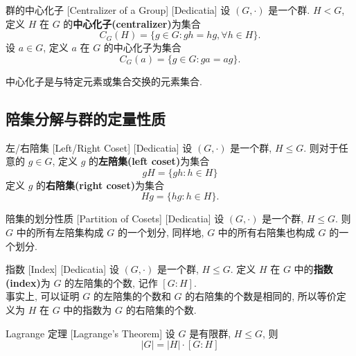         \begin{dfn}
            {群的中心化子}
            [Centralizer of a Group]
            [Dedicatia]
            设 \((G,\cdot)\) 是一个群. \(H<G\), 定义 \(H\) 在 \(G\) 的\textbf{中心化子(centralizer)}为集合
            \[C_G(H)=\{g\in G: gh=hg, \forall h\in H\}.\]
            设 \(a\in G\), 定义 \(a\) 在 \(G\) 的中心化子为集合
            \[C_G(a)=\{g\in G: ga=ag\}.\]
        \end{dfn}

        \begin{rmk}
            中心化子是与特定元素或集合交换的元素集合.
        \end{rmk}

    \subsection{陪集分解与群的定量性质}

        \begin{dfn}
            {左/右陪集}
            [Left/Right Coset]
            [Dedicatia]
            设 \((G,\cdot)\) 是一个群, \(H\leq G\). 则对于任意的 \(g\in G\), 定义 \(g\) 的\textbf{左陪集(left coset)}为集合
            \[gH=\{gh:h\in H\}\]
            定义 \(g\) 的\textbf{右陪集(right coset)}为集合
            \[Hg=\{hg:h\in H\}.\]
        \end{dfn}
    
        \begin{ppt}
            {陪集的划分性质}
            [Partition of Cosets]
            [Dedicatia]
            设 \((G,\cdot)\) 是一个群, \(H\leq G\). 则 \(G\) 中的所有左陪集构成 \(G\) 的一个划分, 同样地, \(G\) 中的所有右陪集也构成 \(G\) 的一个划分.
        \end{ppt}

        \begin{dfn}
            {指数}
            [Index]
            [Dedicatia]
            设 \((G,\cdot)\) 是一个群, \(H\leq G\). 定义 \(H\) 在 \(G\) 中的\textbf{指数(index)}为 \(G\) 的左陪集的个数, 记作 \([G:H]\).\\
            事实上, 可以证明 \(G\) 的左陪集的个数和 \(G\) 的右陪集的个数是相同的, 所以等价定义为 \(H\) 在 \(G\) 中的指数为 \(G\) 的右陪集的个数.
        \end{dfn}
        
        \begin{thm}
            {Lagrange 定理}
            [Lagrange's Theorem]
            设 \(G\) 是有限群, \(H\leq G\), 则
            \[|G|=|H|\cdot [G:H]\]
        \end{thm}

